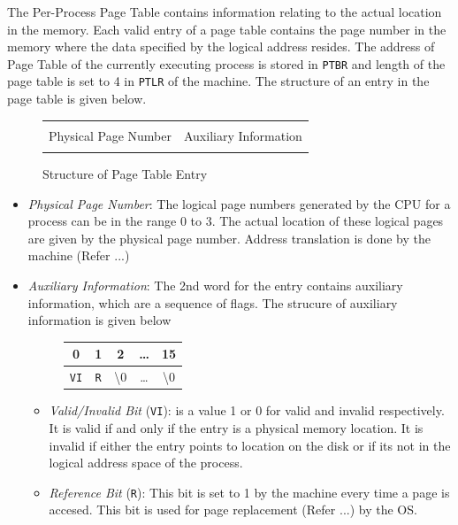 \documentclass[10pt]{report}
\begin{document}
 The Per-Process Page Table contains information relating to the actual location in the memory. Each valid entry of a page table contains the page number in the memory where the data specified by the logical address resides. The address of Page Table of the currently executing process is stored in \texttt{PTBR} and length of the page table is set to 4 in \texttt{PTLR} of the machine. The structure of an entry in the page table is given below.

		\begin{figure}[htp!]
		\centering
		\begin{tabular}{|c|c|}
		\hline
		  	 	& 			\\ 
		 	Physical Page Number & Auxiliary Information  \\
			 	& 			\\  \hline
		\end{tabular}
		\caption{Structure of Page Table Entry}
	\end{figure}

\begin{itemize}
	\item \textit{Physical Page Number}: The logical page numbers generated by the CPU for a process can be in the range 0 to 3. The actual location of these logical pages are given by the physical page number. Address translation is done by the machine (Refer ...)
	
	\item \textit{Auxiliary Information}: The 2nd word for the entry contains auxiliary information, which are a sequence of flags. The strucure of auxiliary information is given below
			\begin{figure}[htp!]
		\centering
		\begin{tabular}{|c|c|c|c|c|}
		0 & 1 & 2 & \ldots & 15 \\
		\hline
		\texttt{VI} & \texttt{R} & \textbackslash 0 & \ldots &  \textbackslash 0 \\
		\hline
		\end{tabular}
		\end{figure}
	
		\begin{itemize}
			\item \textit{Valid/Invalid Bit} (\texttt{VI}): is a value 1 or 0 for valid and invalid respectively. It is valid if and only if the entry is a physical memory location. It is invalid if either the entry points to location on the disk or if its not in the logical address space of the process.
			\item \textit{Reference Bit} (\texttt{R}): This bit is set to 1 by the machine every time a page is accesed. This bit is used for page replacement (Refer ...) by the OS. 
		\end{itemize}

\end{itemize}
	
\end{document}
